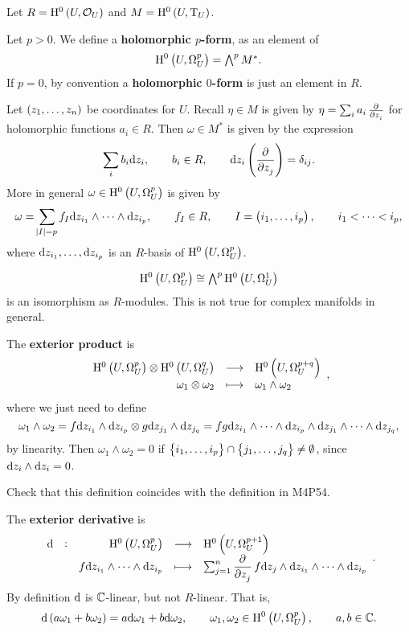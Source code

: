 Let $ R = \H^0\br{U, \OOO_U} $ and $ M = \H^0\br{U, \T_U} $.

\begin{definition}
Let $ p > 0 $. We define a \textbf{holomorphic $ p $-form}, as an element of
$$ \H^0\br{U, \Omega_U^p} = \textstyle\bigwedge^pM^*. $$
If $ p = 0 $, by convention a \textbf{holomorphic $ 0 $-form} is just an element in $ R $.
\end{definition}

Let $ \br{z_1, \dots, z_n} $ be coordinates for $ U $. Recall $ \eta \in M $ is given by $ \eta = \sum_i a_i\tpd{}{z_i} $ for holomorphic functions $ a_i \in R $. Then $ \omega \in M^* $ is given by the expression
$$ \sum_i b_i\d z_i, \qquad b_i \in R, \qquad \d z_i\br{\dpd{}{z_j}} = \delta_{ij}. $$
More in general $ \omega \in \H^0\br{U, \Omega_U^p} $ is given by
$$ \omega = \sum_{\abs{I} = p} f_I\d z_{i_1} \wedge \dots \wedge \d z_{i_p}, \qquad f_I \in R, \qquad I = \br{i_1, \dots, i_p}, \qquad i_1 < \dots < i_p, $$
where $ \mathrm{d} z_{i_1}, \dots, \mathrm{d} z_{i_p} $ is an $ R $-basis of $ \H^0\br{U, \Omega_U^p} $.

\begin{example*}
$$ \H^0\br{U, \Omega_U^p} \cong \textstyle\bigwedge^p\H^0\br{U, \Omega_U^1} $$
is an isomorphism as $ R $-modules. This is not true for complex manifolds in general.
\end{example*}

The \textbf{exterior product} is
$$ \function{\H^0\br{U, \Omega_U^p} \otimes \H^0\br{U, \Omega_U^q}}{\H^0\br{U, \Omega_U^{p + q}}}{\omega_1 \otimes \omega_2}{\omega_1 \wedge \omega_2}, $$
where we just need to define
$$ \omega_1 \wedge \omega_2 = f\mathrm{d} z_{i_1} \wedge \mathrm{d} z_{i_p} \otimes g\mathrm{d} z_{j_1} \wedge \mathrm{d} z_{j_q} = fg\mathrm{d} z_{i_1} \wedge \dots \wedge \mathrm{d} z_{i_p} \wedge \mathrm{d} z_{j_1} \wedge \dots \wedge \mathrm{d} z_{j_q}, $$
by linearity. Then $ \omega_1 \wedge \omega_2 = 0 $ if $ \cbr{i_1, \dots, i_p} \cap \cbr{j_1, \dots, j_q} \ne \emptyset $, since $ \mathrm{d} z_i \wedge \mathrm{d} z_i = 0 $.

\begin{exercise*}
Check that this definition coincides with the definition in M4P54.
\end{exercise*}

The \textbf{exterior derivative} is
$$ \function[\d]{\H^0\br{U, \Omega_U^p}}{\H^0\br{U, \Omega_U^{p + 1}}}{f\d z_{i_1} \wedge \dots \wedge \d z_{i_p}}{\sum_{j = 1}^n \dpd{}{z_j}f\d z_j \wedge \d z_{i_1} \wedge \dots \wedge \d z_{i_p}}. $$
By definition $ \mathrm{d} $ is $ \mathbb{C} $-linear, but not $ R $-linear. That is,
$$ \d\br{a\omega_1 + b\omega_2} = a\d\omega_1 + b\d\omega_2, \qquad \omega_1, \omega_2 \in \H^0\br{U, \Omega_U^p}, \qquad a, b \in \CC. $$

